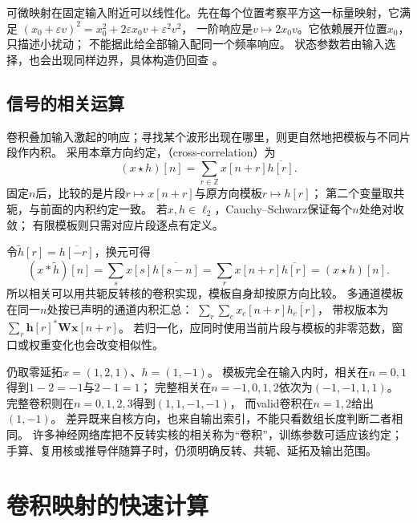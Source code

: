 可微映射在固定输入附近可以线性化。先在每个位置考察平方这一标量映射，它满足
$(x_0+\varepsilon v)^2=x_0^2+2\varepsilon x_0v+\varepsilon^2v^2$，
一阶响应是$v\mapsto2x_0v$。它依赖展开位置$x_0$，只描述小扰动；
不能据此给全部输入配同一个频率响应。
状态参数若由输入选择，也会出现同样边界，具体构造仍回查
。

\subsection{信号的相关运算}
\label{sec:signal-template-correlation}

卷积叠加输入激起的响应；寻找某个波形出现在哪里，则更自然地把模板与不同片段作内积。
采用本章方向约定，（cross-correlation）为
\begin{equation}
  (x\star h)[n]=\sum_{r\in\mathbb Z}x[n+r]\overline{h[r]}.
  \label{eq:signal-analysis-cross-correlation}
\end{equation}
固定$n$后，比较的是片段$r\mapsto x[n+r]$与原方向模板$r\mapsto h[r]$；
第二个变量取共轭，与前面的内积约定一致。
若$x,h\in\ell_2$，Cauchy--Schwarz保证每个$n$处绝对收敛；
有限模板则只需对应片段逐点有定义。

令$\widetilde h[r]=\overline{h[-r]}$，换元可得
\[
  (x*\widetilde h)[n]=\sum_s x[s]\overline{h[s-n]}
  =\sum_r x[n+r]\overline{h[r]}=(x\star h)[n].
\]
所以相关可以用共轭反转核的卷积实现，模板自身却按原方向比较。
多通道模板在同一$n$处按已声明的通道内积汇总：
$\sum_r\sum_c x_c[n+r]\overline{h_c[r]}$，
带权版本为$\sum_r\bm h[r]^*\bm W\bm x[n+r]$。
若归一化，应同时使用当前片段与模板的非零范数，窗口或权重变化也会改变相似性。

仍取零延拓$x=(1,2,1)$、$h=(1,-1)$。
模板完全在输入内时，相关在$n=0,1$得到$1-2=-1$与$2-1=1$；
完整相关在$n=-1,0,1,2$依次为$(-1,-1,1,1)$。
完整卷积则在$n=0,1,2,3$得到$(1,1,-1,-1)$，
而valid卷积在$n=1,2$给出$(1,-1)$。
差异既来自核方向，也来自输出索引，不能只看数组长度判断二者相同。
许多神经网络库把不反转实核的相关称为“卷积”，训练参数可适应该约定；
手算、复用核或推导伴随算子时，仍须明确反转、共轭、延拓及输出范围。

\section{卷积映射的快速计算}
\label{sec:signal-analysis-fast-transforms}

